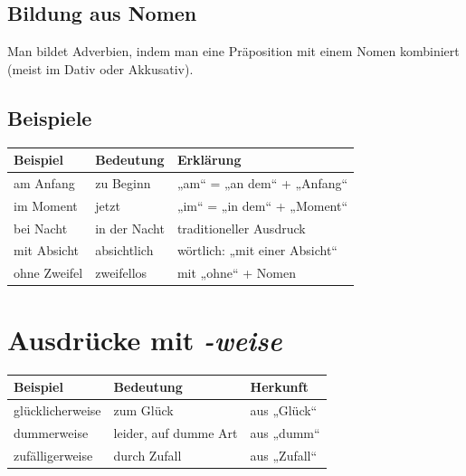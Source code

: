\subsection{Bildung aus Nomen}
    
    Man bildet Adverbien, indem man eine Präposition mit einem Nomen kombiniert
    (meist im Dativ oder Akkusativ).

\subsection{Beispiele}
    
    \begin{table}[h]
        \centering
        \renewcommand{\arraystretch}{1.3}
        \begin{tabular}{|l|l|p{6cm}|}
            \hline
            \textbf{Beispiel} & \textbf{Bedeutung} & \textbf{Erklärung}            \\
            \hline
            am Anfang         & zu Beginn          & „am“ = „an dem“ + „Anfang“    \\
            \hline
            im Moment         & jetzt              & „im“ = „in dem“ + „Moment“    \\
            \hline
            bei Nacht         & in der Nacht       & traditioneller Ausdruck       \\
            \hline
            mit Absicht       & absichtlich        & wörtlich: „mit einer Absicht“ \\
            \hline
            ohne Zweifel      & zweifellos         & mit „ohne“ + Nomen            \\
            \hline
        \end{tabular}
    \end{table}


\section{Ausdrücke mit \textit{-weise}}

\begin{table}[h]
    \centering
    \renewcommand{\arraystretch}{1.3}
    \begin{tabular}{|l|l|p{6cm}|}
        \hline
        \textbf{Beispiel} & \textbf{Bedeutung}    & \textbf{Herkunft} \\
        \hline
        glücklicherweise  & zum Glück             & aus „Glück“       \\
        \hline
        dummerweise       & leider, auf dumme Art & aus „dumm“        \\
        \hline
        zufälligerweise   & durch Zufall          & aus „Zufall“      \\
        \hline
    \end{tabular}
\end{table}


